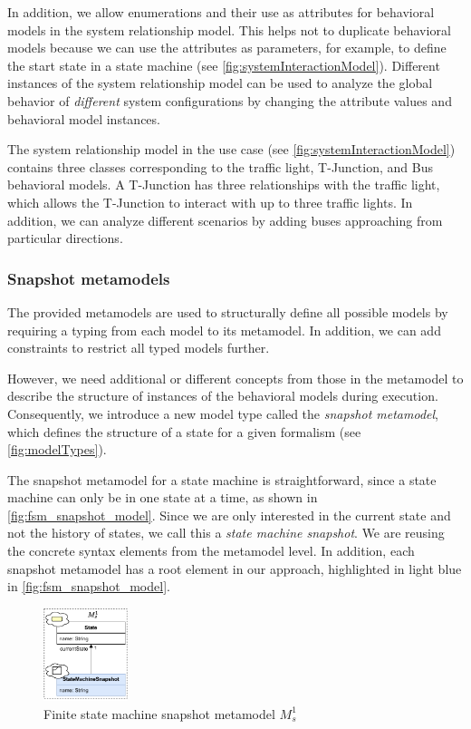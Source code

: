 \documentclass{jot}
\begin{document}
In addition, we allow enumerations and their use as attributes for behavioral models in the system relationship model.
This helps not to duplicate behavioral models because we can use the attributes as parameters, for example, to define the start state in a state machine (see \autoref{fig:systemInteractionModel}).
Different instances of the system relationship model can be used to analyze the global behavior of \emph{different} system configurations by changing the attribute values and behavioral model instances.

The system relationship model in the use case (see \autoref{fig:systemInteractionModel}) contains three classes corresponding to the traffic light, T-Junction, and Bus behavioral models.
A T-Junction has three relationships with the traffic light, which allows the T-Junction to interact with up to three traffic lights.
In addition, we can analyze different scenarios by adding buses approaching from particular directions.

\subsubsection{Snapshot metamodels}
The provided metamodels are used to structurally define all possible models by requiring a typing from each model to its metamodel.
In addition, we can add constraints to restrict all typed models further.

However, we need additional or different concepts from those in the metamodel to describe the structure of instances of the behavioral models during execution.
Consequently, we introduce a new model type called the \emph{snapshot metamodel}, which defines the structure of a state for a given formalism (see \autoref{fig:modelTypes}).

The snapshot metamodel for a state machine is straightforward, since a state machine can only be in one state at a time, as shown in \autoref{fig:fsm_snapshot_model}.
Since we are only interested in the current state and not the history of states, we call this a \emph{state machine snapshot}.
We are reusing the concrete syntax elements from the metamodel level.
In addition, each snapshot metamodel has a root element in our approach, highlighted in light blue in \autoref{fig:fsm_snapshot_model}.
\begin{figure}[h]
    \centering
    \includegraphics[width=0.22\textwidth]{figures/state_machine_s_model.pdf}
    \caption{Finite state machine snapshot metamodel $M_s^1$}
    \label{fig:fsm_snapshot_model}
\end{figure}
\end{document}
